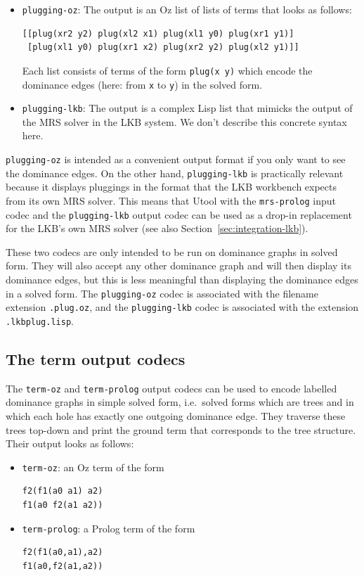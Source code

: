 \begin{itemize}
\item \verb?plugging-oz?: The output is an Oz list of lists of terms
  that looks as follows:
\begin{verbatim}
[[plug(xr2 y2) plug(xl2 x1) plug(xl1 y0) plug(xr1 y1)]
 [plug(xl1 y0) plug(xr1 x2) plug(xr2 y2) plug(xl2 y1)]]
\end{verbatim}
Each list consists of terms of the form \verb?plug(x y)? which encode
the dominance edges (here: from \verb?x? to \verb?y?) in the solved
form.
\item \verb?plugging-lkb?: The output is a complex Lisp list that
mimicks the output of the MRS solver in the LKB system. We don't
describe this concrete syntax here.
\end{itemize}

\verb?plugging-oz? is intended as a convenient output format if you
only want to see the dominance edges. On the other hand,
\verb?plugging-lkb? is practically relevant because it displays
pluggings in the format that the LKB workbench expects from its own
MRS solver. This means that Utool with the \verb?mrs-prolog? input
codec and the \verb?plugging-lkb? output codec can be used as a
drop-in replacement for the LKB's own MRS solver (see also
Section~\ref{sec:integration-lkb}).

These two codecs are only intended to be run on dominance graphs in
solved form. They will also accept any other dominance graph and will
then display its dominance edges, but this is less meaningful than
displaying the dominance edges in a solved form. The
\verb?plugging-oz? codec is associated with the filename extension
\verb?.plug.oz?, and the \verb?plugging-lkb? codec is associated with
the extension \verb?.lkbplug.lisp?.



\subsection{The term output codecs}

The \verb?term-oz? and \verb?term-prolog? output codecs can be used to
encode labelled dominance graphs in simple solved form, i.e.\ solved
forms which are trees and in which each hole has exactly one outgoing
dominance edge. They traverse these trees top-down and print the
ground term that corresponds to the tree structure. Their output looks
as follows:
\begin{itemize}
\item \verb?term-oz?: an Oz term of the form
\begin{verbatim}
f2(f1(a0 a1) a2)
f1(a0 f2(a1 a2))
\end{verbatim}
\item \verb?term-prolog?:  a Prolog term of the form
\begin{verbatim}
f2(f1(a0,a1),a2)
f1(a0,f2(a1,a2))
\end{verbatim}
\end{itemize}

